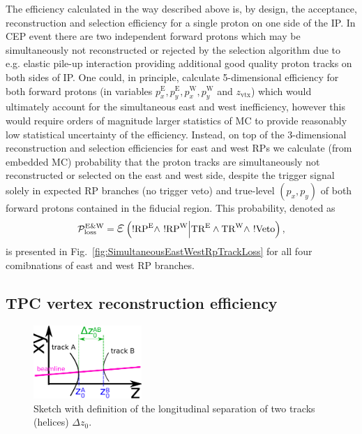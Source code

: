

The efficiency calculated in the way described above is, by design, the acceptance, reconstruction and selection efficiency for a single proton on one side of the IP. In CEP event there are two independent forward protons which may be simultaneously not reconstructed or rejected by the selection algorithm due to e.g. elastic pile-up interaction providing additional good quality proton tracks on both sides of IP. One could, in principle, calculate 5-dimensional efficiency for both forward protons (in variables $p_{x}^{\text{E}}, p_{y}^{\text{E}}, p_{x}^{\text{W}}, p_{y}^{\text{W}}$ and $z_{\text{vtx}}$) which would ultimately account for the simultaneous east and west inefficiency, however this would require orders of magnitude larger statistics of MC to provide reasonably low statistical uncertainty of the efficiency. Instead, on top of the 3-dimensional reconstruction and selection efficiencies for east and west RPs we calculate (from embedded MC) probability that the proton tracks are simultaneously not reconstructed or selected on the east and west side, despite the trigger signal solely in expected RP branches (no trigger veto) and true-level $(p_{x}, p_{y})$ of both forward protons contained in the fiducial region. This probability, denoted as
\begin{equation}
\mathcal{P}^{\text{E\&W}}_{\text{loss}} = \mbox{\LARGE$\varepsilon$}\left(!\RPE\land~!\RPW\Big|\TRE\land\TRW\land~!\V\Big.\right),
\end{equation}
 is presented in Fig.~\ref{fig:SimultaneousEastWestRpTrackLoss} for all four comibnations of east and west RP branches.





\subsection{TPC vertex reconstruction efficiency}\label{sec:tpcVxRecoEff}

\begin{figure}\vspace*{-9pt}
  \centering
  \includegraphics[width=0.365\textwidth]{graphics/corrections/deltaZ0Definition2.pdf}
  \caption[Sketch with definition of $\Delta z_{0}$.]
   {Sketch with definition of the longitudinal separation of two tracks (helices) $\Delta z_{0}$.}
   \label{fig:deltaZ0Sketch}\vspace*{-9pt} 
\end{figure}

